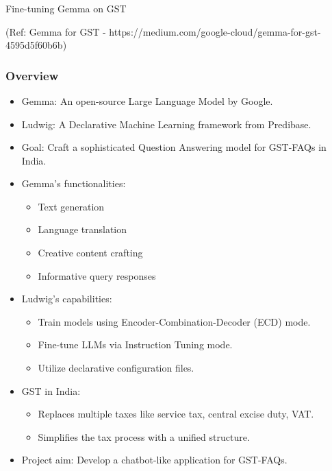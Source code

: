 \begin{frame}[fragile]\frametitle{}
\begin{center}
{\Large Fine-tuning Gemma on GST}

{\tiny (Ref: Gemma for GST - https://medium.com/google-cloud/gemma-for-gst-4595d5f60b6b)}

\end{center}
\end{frame}


\begin{frame}[fragile]\frametitle{Overview}
\begin{itemize}
    \item Gemma: An open-source Large Language Model by Google.
    \item Ludwig: A Declarative Machine Learning framework from Predibase.
    \item Goal: Craft a sophisticated Question Answering model for GST-FAQs in India.
    \item Gemma's functionalities:
    \begin{itemize}
        \item Text generation
        \item Language translation
        \item Creative content crafting
        \item Informative query responses
    \end{itemize}
    \item Ludwig's capabilities:
    \begin{itemize}
        \item Train models using Encoder-Combination-Decoder (ECD) mode.
        \item Fine-tune LLMs via Instruction Tuning mode.
        \item Utilize declarative configuration files.
    \end{itemize}
    \item GST in India:
    \begin{itemize}
        \item Replaces multiple taxes like service tax, central excise duty, VAT.
        \item Simplifies the tax process with a unified structure.
    \end{itemize}
    \item Project aim: Develop a chatbot-like application for GST-FAQs.
\end{itemize}
\end{frame}

